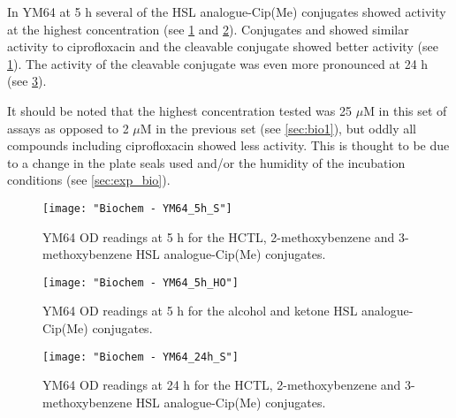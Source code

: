 

In YM64 at 5 h several of the HSL analogue-Cip(Me) conjugates showed activity at the highest concentration (see \ref{fgr:YM64_5h_S} and \ref{fgr:YM64_5h_HO}). 
Conjugates  and  showed similar activity to ciprofloxacin  and the cleavable conjugate
 showed better activity (see \ref{fgr:YM64_5h_S}).
The activity of the cleavable conjugate  was even more pronounced at 24 h (see \ref{fgr:YM64_24h_S}).

It should be noted that the highest concentration tested was 25 $\mu$M in this set of assays as opposed to 2 $\mu$M in the previous set (see \ref{sec:bio1}), but oddly all compounds including ciprofloxacin  showed less activity. This is thought to be due to a change in the plate seals used and/or the humidity of the incubation conditions (see \ref{sec:exp_bio}). 


\begin{figure}[H]
	\begin{center}
		\texttt{[image: "Biochem - YM64\_5h\_S"]}
		\caption{YM64 OD readings at 5 h for the HCTL, 2-methoxybenzene and 3-methoxybenzene HSL analogue-Cip(Me) conjugates.\label{fgr:YM64_5h_S}}
	\end{center}
\end{figure}

\begin{figure}[H]
	\begin{center}
		\texttt{[image: "Biochem - YM64\_5h\_HO"]}
		\caption{YM64 OD readings at 5 h for the alcohol and ketone HSL analogue-Cip(Me) conjugates.\label{fgr:YM64_5h_HO}}
	\end{center}
\end{figure}

\begin{figure}[H]
	\begin{center}
		\texttt{[image: "Biochem - YM64\_24h\_S"]}
		\caption{YM64 OD readings at 24 h for the HCTL, 2-methoxybenzene and 3-methoxybenzene HSL analogue-Cip(Me) conjugates.\label{fgr:YM64_24h_S}}
	\end{center}
\end{figure}

